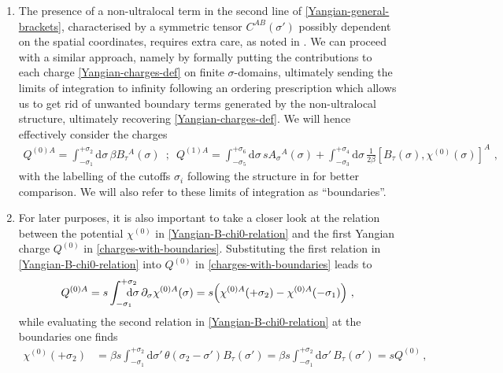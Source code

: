 \documentclass[12pt]{article}
\numberwithin{equation}{section}
\begin{document}
\begin{enumerate}
\item The presence of a non-ultralocal term in the second line of \eqref{Yangian-general-brackets}, characterised by a symmetric tensor $C^{AB}(\sigma')$ possibly dependent on the spatial coordinates, requires extra care, as noted in \cite{Klose:2016qfv}. We can proceed with a similar approach, namely by formally putting the contributions to each charge \eqref{Yangian-charges-def} on finite $\sigma$-domains, ultimately sending the limits of integration to infinity following an ordering prescription which allows us to get rid of unwanted boundary terms generated by the non-ultralocal structure, ultimately recovering \eqref{Yangian-charges-def}. We will hence effectively consider the charges
\begin{equation}\label{charges-with-boundaries}
\begin{aligned}
\!\!\!\!\! Q^{(0)A}\!=\!\!\int_{-\sigma_{1}}^{+\sigma_{2}} \!\!\!\!\!\!\! \mathrm{d}\sigma \, \beta B_{\tau}{}^{A}(\sigma) 
\,\,\,;\,\,\,
Q^{(1)A}\!=\!\!\int_{-\sigma_{5}}^{+\sigma_{6}} \!\!\!\!\!\!\! \mathrm{d}\sigma \, s A_{\sigma}{}^{A}(\sigma)+\!\!\int_{-\sigma_{3}}^{+\sigma_{4}} \!\!\!\!\!\!\! \mathrm{d}\sigma \, \tfrac{1}{2\beta}[ B_{\tau}(\sigma),\chi^{(0)}(\sigma)]^{A} \,\, ,
\end{aligned}
\end{equation}
with the labelling of the cutoffs $\sigma_i$ following the structure in \cite{Klose:2016qfv} for better comparison. We will also refer to these limits of integration as ``boundaries''.
\item For later purposes, it is also important to take a closer look at the relation between the potential $\chi^{(0)}$ in \eqref{Yangian-B-chi0-relation} and the first Yangian charge $Q^{(0)}$ in \eqref{charges-with-boundaries}. Substituting the first relation in \eqref{Yangian-B-chi0-relation} into $Q^{(0)}$ in \eqref{charges-with-boundaries} leads to
\begin{equation}
 Q^{(0)A}=s\int_{-\sigma_{1}}^{+\sigma_{2}} \!\!\!\!\!\!\! \mathrm{d}\sigma \, \partial_{\sigma} \chi^{(0)A}(\sigma) = s\Bigl( \chi^{(0)A}(+\sigma_{2})-\chi^{(0)A}(-\sigma_{1})\Bigr) \,\, ,
\end{equation}
while evaluating the second relation in \eqref{Yangian-B-chi0-relation} at the boundaries one finds
\begin{equation}
\begin{aligned}
\chi^{(0)}(+\sigma_{2})&=\beta s\int_{-\sigma_{1}}^{+\sigma_{2}}\!\!\!\!\!\!\!\!\!\!\mathrm{d}\sigma' \, \theta(\sigma_{2}\!-\!\sigma')B_{\tau}(\sigma')=\beta s\int_{-\sigma_{1}}^{+\sigma_{2}}\!\!\!\!\!\!\!\!\!\!\mathrm{d}\sigma' \, B_{\tau}(\sigma')=sQ^{(0)} \, ,

\end{aligned}
\end{equation}
\end{enumerate}
\end{document}
